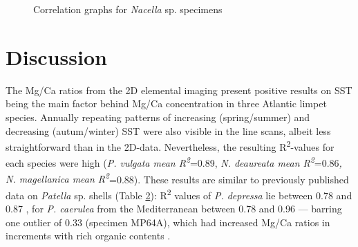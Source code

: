 \documentclass[
  authoryear,
  preprint,
  3p]{elsarticle}
\begin{document}
\begin{figure}


\caption{\label{fig-Nac_Corr}Correlation graphs for \emph{Nacella} sp.
specimens}

\end{figure}%

\section{Discussion}\label{Discussion}

The Mg/Ca ratios from the 2D elemental imaging present positive results
on SST being the main factor behind Mg/Ca concentration in three
Atlantic limpet species. Annually repeating patterns of increasing
(spring/summer) and decreasing (autum/winter) SST were also visible in
the line scans, albeit less straightforward than in the 2D-data.
Nevertheless, the resulting R\textsuperscript{2}-values for each species
were high (\emph{P. vulgata mean R\textsuperscript{2}}=0.89, \emph{N.
deaureata mean R\textsuperscript{2}}=0.86\emph{, N. magellanica mean
R\textsuperscript{2}}=0.88). These results are similar to previously
published data on \emph{Patella} sp. shells (Table
\hyperref[Table_2]{2}): R\textsuperscript{2} values of \emph{P.
depressa} lie between 0.78 and 0.87 \citep{Garcia-Escarzaga2021-ij}, for
\emph{P. caerulea} from the Mediterranean between 0.78 and 0.96 ---
barring one outlier of 0.33 (specimen MP64A), which had increased Mg/Ca
ratios in increments with rich organic contents \citep{Hausmann2019-fi}.

\label{Table_2}
\fontsize{8pt}{8pt}\selectfont
\end{document}
